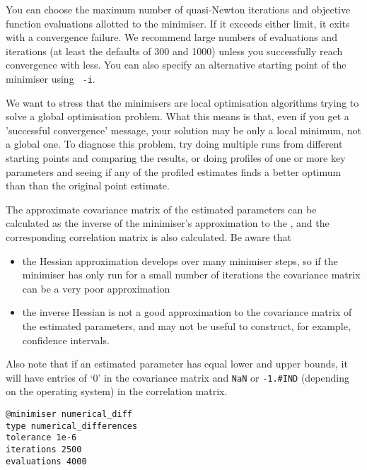 You can choose the maximum number of quasi-Newton iterations and objective function evaluations allotted to the minimiser. If it exceeds either limit, it exits with a convergence failure. We recommend large numbers of evaluations and iterations (at least the defaults of 300 and 1000) unless you successfully reach convergence with less. You can also specify an alternative starting point of the minimiser using \texttt{\cname\ -i}.

We want to stress that the minimisers are local optimisation algorithms trying to solve a global optimisation problem. What this means is that, even if you get a 'successful convergence' message, your solution may be only a local minimum, not a global one. To diagnose this problem, try doing multiple runs from different starting points and comparing the results, or doing profiles of one or more key parameters and seeing if any of the profiled estimates finds a better optimum than than the original point estimate.

The approximate covariance matrix of the estimated parameters can be calculated as the inverse of the minimiser's approximation to the , and the corresponding correlation matrix is also calculated. Be aware that

\begin{itemize}
\item the Hessian approximation develops over many minimiser steps, so if the minimiser has only run for a small number of iterations the covariance matrix can be a very poor approximation
\item the inverse Hessian is not a good approximation to the covariance matrix of the estimated parameters, and may not be useful to construct, for example, confidence intervals. 
\end{itemize}

Also note that if an estimated parameter has equal lower and upper bounds, it will have entries of `0' in the covariance matrix and \texttt{NaN} or \texttt{-1.\#IND} (depending on the operating system) in the correlation matrix. 

{\small{\begin{verbatim}
@minimiser numerical_diff
type numerical_differences
tolerance 1e-6
iterations 2500
evaluations 4000
\end{verbatim}}}

